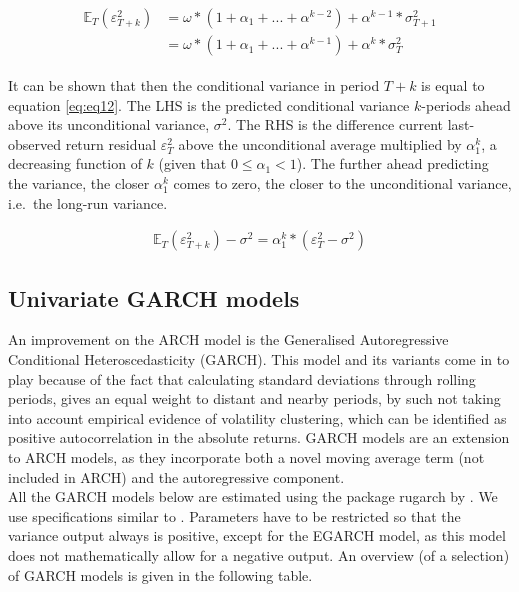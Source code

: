 \documentclass[a4paper, twoside]{templates/ociamthesis}
\begin{document}
\begin{align} 
\begin{split}
\mathbb{E}_T(\varepsilon_{T+k}^2) 
&= \omega*(1+\alpha_1 + ... + \alpha^{k-2}) + \alpha^{k-1}*\sigma_{T+1}^2 \\
&= \omega*(1+\alpha_1 + ... + \alpha^{k-1}) + \alpha^{k}*\sigma_{T}^2
\end{split}
 \label{eq:eq11}
\end{align}

\noindent It can be shown that then the conditional variance in period \(T+k\) is equal to equation \eqref{eq:eq12}. The LHS is the predicted conditional variance \(k\)-periods ahead above its unconditional variance, \(\sigma^2\). The RHS is the difference current last-observed return residual \(\varepsilon_T^2\) above the unconditional average multiplied by \(\alpha_1^k\), a decreasing function of \(k\) (given that \(0 \le\alpha_1 <1\)). The further ahead predicting the variance, the closer \(\alpha_1^k\) comes to zero, the closer to the unconditional variance, i.e.~the long-run variance.

\begin{align} 
\mathbb{E}_T(\varepsilon_{T+k}^2) - \sigma^2 = \alpha_1^k*(\varepsilon_T^2 - \sigma^2)
 \label{eq:eq12}
\end{align}

\newpage

\hypertarget{univ-garch}{%
\subsection{Univariate GARCH models}\label{univ-garch}}

\noindent An improvement on the ARCH model is the Generalised Autoregressive Conditional Heteroscedasticity (GARCH). This model and its variants come in to play because of the fact that calculating standard deviations through rolling periods, gives an equal weight to distant and nearby periods, by such not taking into account empirical evidence of volatility clustering, which can be identified as positive autocorrelation in the absolute returns. GARCH models are an extension to ARCH models, as they incorporate both a novel moving average term (not included in ARCH) and the autoregressive component.~\\

All the GARCH models below are estimated using the package rugarch by \textcite{alexios2020}. We use specifications similar to \textcite{ghalanos2020}. Parameters have to be restricted so that the variance output always is positive, except for the EGARCH model, as this model does not mathematically allow for a negative output. An overview (of a selection) of GARCH models is given in the following table.
\end{document}
